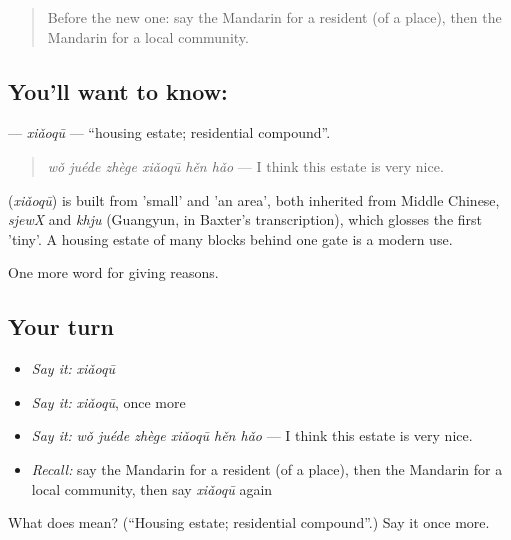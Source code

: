 \label{lesson:ZH-C377-xiaoqu}



\begin{quote}
Before the new one: say the Mandarin for a resident (of a place), then the Mandarin for a local community.
\end{quote}

\subsection*{You'll want to know: }
\textbf{} — \emph{xiǎoqū} — \textquotedblleft{}housing estate; residential compound\textquotedblright{}.

\begin{quote}
\textbf{} \emph{wǒ juéde zhège xiǎoqū hěn hǎo} — I think this estate is very nice.
\end{quote}

\begin{cousinweb}
\textbf{} (\emph{xiǎoqū}) is built from  'small' and  'an area', both inherited from Middle Chinese, \emph{sjewX} and \emph{khju} (Guangyun, in Baxter's transcription), which glosses the first 'tiny'. A housing estate of many blocks behind one gate is a modern use.
\end{cousinweb}

\begin{grammarlens}[title={What you've built}]
One more word for giving reasons.
\end{grammarlens}

\subsection*{Your turn}
\begin{itemize}
\raggedright
  \item \emph{Say it:} \emph{xiǎoqū}
  \item \emph{Say it:} \emph{xiǎoqū}, once more
  \item \emph{Say it:} \emph{wǒ juéde zhège xiǎoqū hěn hǎo} — I think this estate is very nice.
  \item \emph{Recall:} say the Mandarin for a resident (of a place), then the Mandarin for a local community, then say \emph{xiǎoqū} again
\end{itemize}

\begin{tcolorbox}[breakable,colback=teal!4,colframe=teal!35!black,title={Before you move on}]
What does  mean? (\textquotedblleft{}Housing estate; residential compound\textquotedblright{}.) Say it once more.
\end{tcolorbox}
